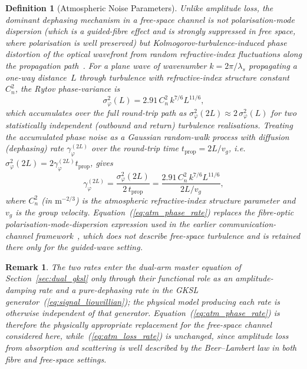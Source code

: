 \documentclass[journal]{IEEEtran}
\newtheorem{definition}{Definition}
\newtheorem{remark}{Remark}
\begin{document}
\begin{definition}[Atmospheric Noise Parameters]
Unlike amplitude loss, the dominant dephasing mechanism in a \emph{free-space} channel is \emph{not} polarisation-mode dispersion (which is a guided-fibre effect and is strongly suppressed in free space, where polarisation is well preserved) but Kolmogorov-turbulence-induced phase distortion of the optical wavefront from random refractive-index fluctuations along the propagation path~\cite{tatarskii1971effects,andrews2005laser}. For a plane wave of wavenumber $k = 2\pi/\lambda_s$ propagating a one-way distance~$L$ through turbulence with refractive-index structure constant~$C_n^2$, the Rytov phase-variance is
\begin{equation}\label{eq:rytov_variance}
\sigma_\varphi^2(L) = 2.91\, C_n^2\, k^{7/6} L^{11/6},
\end{equation}
which accumulates over the full round-trip path as $\sigma_\varphi^2(2L) \approx 2\,\sigma_\varphi^2(L)$ for two statistically independent (outbound and return) turbulence realisations. Treating the accumulated phase noise as a Gaussian random-walk process with diffusion (dephasing) rate $\gamma_\varphi^{(2L)}$ over the round-trip time $t_{\text{prop}} = 2L/v_g$, i.e.\ $\sigma_\varphi^2(2L) = 2\gamma_\varphi^{(2L)} t_{\text{prop}}$, gives
\begin{equation}\label{eq:atm_phase_rate}
\gamma_{\varphi}^{(2L)} = \frac{\sigma_\varphi^2(2L)}{2\, t_{\text{prop}}} = \frac{2.91\, C_n^2\, k^{7/6} L^{11/6}}{2L/v_g},
\end{equation}
where $C_n^2$ (in $\text{m}^{-2/3}$) is the atmospheric refractive-index structure parameter and $v_g$ is the group velocity. Equation~(\ref{eq:atm_phase_rate}) replaces the fibre-optic polarisation-mode-dispersion expression used in the earlier communication-channel framework~\cite{gautum2024rigorous}, which does not describe free-space turbulence and is retained there only for the guided-wave setting.
\end{definition}

\begin{remark}
The two rates enter the dual-arm master equation of Section~\ref{sec:dual_gksl} only through their functional role as an amplitude-damping rate and a pure-dephasing rate in the GKSL generator~(\ref{eq:signal_liouvillian}); the physical model producing each rate is otherwise independent of that generator. Equation~(\ref{eq:atm_phase_rate}) is therefore the physically appropriate replacement for the free-space channel considered here, while~(\ref{eq:atm_loss_rate}) is unchanged, since amplitude loss from absorption and scattering is well described by the Beer--Lambert law in both fibre and free-space settings.
\end{remark}
\end{document}
